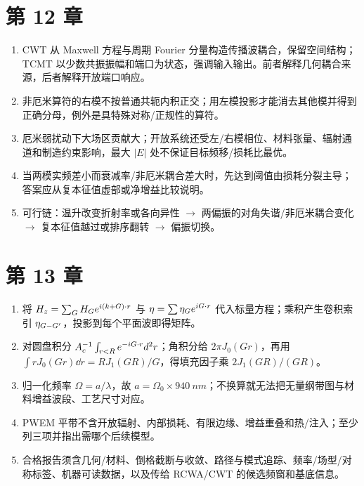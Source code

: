 \section{第 12 章}
\begin{enumerate}
  \item CWT 从 Maxwell 方程与周期 Fourier 分量构造传播波耦合，保留空间结构；TCMT 以少数共振振幅和端口为状态，强调输入输出。前者解释几何耦合来源，后者解释开放端口响应。
  \item 非厄米算符的右模不按普通共轭内积正交；用左模投影才能消去其他模并得到正确分母，例外是具特殊对称/正规性的算符。
  \item 厄米弱扰动下大场区贡献大；开放系统还受左/右模相位、材料张量、辐射通道和制造约束影响，最大 $|E|$ 处不保证目标频移/损耗比最优。
  \item 当两模实频差小而衰减率/非厄米耦合差大时，先达到阈值由损耗分裂主导；答案应从复本征值虚部或净增益比较说明。
  \item 可行链：温升改变折射率或各向异性 $\to$ 两偏振的对角失谐/非厄米耦合变化 $\to$ 复本征值越过或排序翻转 $\to$ 偏振切换。
\end{enumerate}

\section{第 13 章}
\begin{enumerate}
  \item 将 $H_z=\sum_{G}H_{G}e^{i(k+G)\cdot r}$ 与 $\eta=\sum\eta_{G}e^{iG\cdot r}$ 代入标量方程；乘积产生卷积索引 $\eta_{G-G'}$，投影到每个平面波即得矩阵。
  \item 对圆盘积分 $A_c^{-1}\int_{r<R}e^{-iG\cdot r}d^2r$；角积分给 $2\pi J_0(Gr)$，再用 $\int rJ_0(Gr)\dd r=RJ_1(GR)/G$，得填充因子乘 $2J_1(GR)/(GR)$。
  \item 归一化频率 $\Omega=a/\lambda$，故 $a=\Omega_0\times\SI{940}{nm}$；不换算就无法把无量纲带图与材料增益波段、工艺尺寸对应。
  \item PWEM 平带不含开放辐射、内部损耗、有限边缘、增益重叠和热/注入；至少列三项并指出需哪个后续模型。
  \item 合格报告须含几何/材料、倒格截断与收敛、路径与模式追踪、频率/场型/对称标签、机器可读数据，以及传给 RCWA/CWT 的候选频窗和基底信息。
\end{enumerate}

